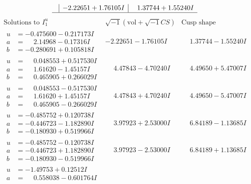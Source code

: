 \documentclass[1p]{elsarticle_modified}
\theoremstyle{definition}
\newcommand{\I}{\sqrt{-1}}
\begin{document}
$$\begin{array}{c|c|c}
 & -2.22651 + 1.76105 I & \phantom{-}1.37744 + 1.55240 I\\
 \hline 
 \end{array}$$\newpage$$\begin{array}{c|c|c}  
\text{Solutions to }I^u_{1}& \I (\text{vol} + \sqrt{-1}CS) & \text{Cusp shape}\\
 \hline 
\begin{aligned}
u &= -0.475600 - 0.217173 I \\
a &= \phantom{-}2.14968 - 0.17316 I \\
b &= -0.280691 + 0.105818 I\end{aligned}
 & -2.22651 - 1.76105 I & \phantom{-}1.37744 - 1.55240 I \\ \hline\begin{aligned}
u &= \phantom{-}0.048553 + 0.517530 I \\
a &= \phantom{-}1.61620 - 1.45157 I \\
b &= \phantom{-}0.465905 + 0.266029 I\end{aligned}
 & \phantom{-}4.47843 - 4.70240 I & \phantom{-}4.49650 + 5.47007 I \\ \hline\begin{aligned}
u &= \phantom{-}0.048553 - 0.517530 I \\
a &= \phantom{-}1.61620 + 1.45157 I \\
b &= \phantom{-}0.465905 - 0.266029 I\end{aligned}
 & \phantom{-}4.47843 + 4.70240 I & \phantom{-}4.49650 - 5.47007 I \\ \hline\begin{aligned}
u &= -0.485752 + 0.120738 I \\
a &= -0.446723 - 1.182890 I \\
b &= -0.180930 + 0.519966 I\end{aligned}
 & \phantom{-}3.97923 + 2.53000 I & \phantom{-}6.84189 - 1.13685 I \\ \hline\begin{aligned}
u &= -0.485752 - 0.120738 I \\
a &= -0.446723 + 1.182890 I \\
b &= -0.180930 - 0.519966 I\end{aligned}
 & \phantom{-}3.97923 - 2.53000 I & \phantom{-}6.84189 + 1.13685 I \\ \hline\begin{aligned}
u &= -1.49753 + 0.12512 I \\
a &= \phantom{-}0.558038 - 0.601764 I \\

\end{aligned}
\end{array}$$
\end{document}
